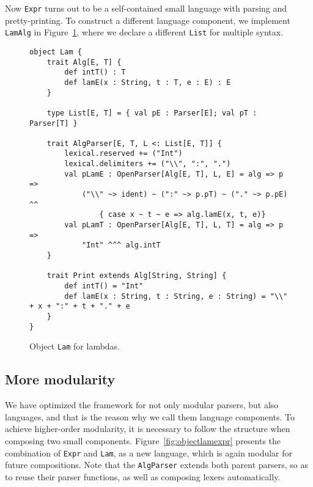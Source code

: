 Now \lstinline{Expr} turns out to be a self-contained small language with parsing and pretty-printing. To construct a different language component, we implement \lstinline{LamAlg} in Figure~\ref{fig:objectlam}, where we declare a different \lstinline{List} for multiple syntax.

\begin{figure}[htbp]
\centering
\begin{lstlisting}
object Lam {
    trait Alg[E, T] {
        def intT() : T
        def lamE(x : String, t : T, e : E) : E
    }

    type List[E, T] = { val pE : Parser[E]; val pT : Parser[T] }

    trait AlgParser[E, T, L <: List[E, T]] {
        lexical.reserved += ("Int")
        lexical.delimiters += ("\\", ":", ".")
        val pLamE : OpenParser[Alg[E, T], L, E] = alg => p =>
            ("\\" ~> ident) ~ (":" ~> p.pT) ~ ("." ~> p.pE) ^^
                { case x ~ t ~ e => alg.lamE(x, t, e)}
        val pLamT : OpenParser[Alg[E, T], L, T] = alg => p =>
            "Int" ^^^ alg.intT
    }

    trait Print extends Alg[String, String] {
        def intT() = "Int"
        def lamE(x : String, t : String, e : String) = "\\" + x + ":" + t + "." + e
    }
}
\end{lstlisting}
\caption{Object \lstinline{Lam} for lambdas.}\label{fig:objectlam}
\end{figure}

\subsection{More modularity}



We have optimized the framework for not only modular parsers, but also languages, and that is the reason why we call them language components. To achieve
higher-order modularity, it is necessary to follow the structure when composing two small components. Figure~\ref{fig:objectlamexpr} presents the combination of \lstinline{Expr} and \lstinline{Lam}, as a new language, which is again modular for future compositions. Note that the \lstinline{AlgParser} extends both parent parsers, so as to reuse their parser functions, as well as composing lexers automatically.

